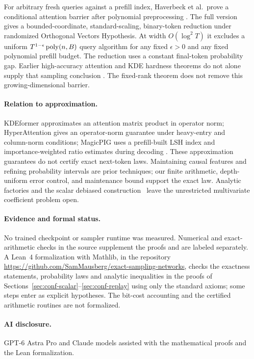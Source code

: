 \documentclass[11pt]{article}
\theoremstyle{definition}\newtheorem{definition}[theorem]{Definition}
\theoremstyle{remark}\newtheorem{remark}[theorem]{Remark}
\numberwithin{equation}{section}
\begin{document}
For arbitrary fresh queries against a prefill index, Haverbeck et al.\ 
prove a conditional attention barrier after polynomial preprocessing
\cite{haverbeck2026attention}. The full version gives a bounded-coordinate,
standard-scaling, binary-token reduction under randomized Orthogonal
Vectors Hypothesis. At width $O(\log^2T)$ it excludes a uniform
$T^{1-\epsilon}\operatorname{poly}(n,B)$ query algorithm for any fixed $\epsilon>0$
and any fixed polynomial prefill budget. The reduction uses a constant
final-token probability gap. Earlier high-accuracy attention and KDE
hardness theorems do not alone supply that sampling conclusion
\cite{alman2023attention,aggarwal2022polynomial,alman2024kde}.
The fixed-rank theorem does not remove this growing-dimensional barrier.

\paragraph{Relation to approximation.}
KDEformer approximates an attention matrix product in operator norm;
HyperAttention gives an operator-norm guarantee under heavy-entry and
column-norm conditions; MagicPIG uses a prefill-built LSH index and
importance-weighted ratio estimates during decoding
\cite{kdeformer2023,hyperattention2023,magicpig2024}.
These approximation guarantees do not certify exact next-token laws.
Maintaining causal features and refining probability intervals are prior
techniques; our finite arithmetic, depth-uniform error control, and
maintenance bound support the exact law. Analytic factories and the
scalar debiased construction~\cite{koskela2026debiased} leave the
unrestricted multivariate coefficient problem open.

\paragraph{Evidence and formal status.}
No trained checkpoint or sampler runtime was measured. Numerical and
exact-arithmetic checks in the source supplement the proofs and are
labeled separately. A Lean~4 formalization with Mathlib, in the
repository \url{https://github.com/SamMausberg/exact-sampling-networks},
checks the exactness statements, probability laws and analytic inequalities
in the proofs of Sections~\ref{sec:conf-scalar}--\ref{sec:conf-replay}
using only the standard axioms; some steps enter as explicit hypotheses.
The bit-cost accounting and the certified arithmetic routines are not formalized.

\paragraph{AI disclosure.}
GPT-6 Astra Pro and Claude models assisted with the mathematical proofs
and the Lean formalization.
\label{page:conf-main-end}
\clearpage

\end{document}
